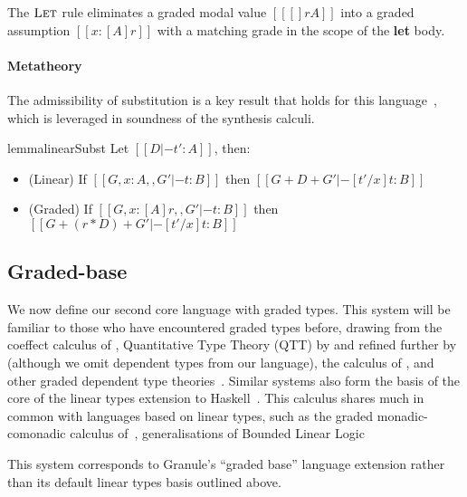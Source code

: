 The $\textsc{Let}$ rule eliminates a graded modal value $[[ [] r A ]]$
into a graded assumption $[[ x : [ A ] r ]]$ with a matching
grade in the scope of the \textbf{let} body.


\paragraph{Metatheory}
The admissibility of substitution is a key result that holds
for this language~\cite{DBLP:journals/pacmpl/OrchardLE19}, which is
leveraged in soundness of the synthesis calculi.
%
\begin{restatable}{lemma}{linearSubst}
Let $[[ D |- t' : A]]$, then:
\label{lemma:substitution}
\begin{itemize}[leftmargin=1em]
\item (Linear) \hspace{0.04em} If $[[ {G, x : A}
    ,, { G' } |- t : B]]$ then $[[ G + D + G' |-
[ t' / x ] t : B ]]$
\item (Graded) If $[[ {G, x : [A] r} ,, { G' } |- t : B]]$
then $[[ G + (r * D) + G' |- [ t' / x ] t : B ]]$
\end{itemize}
\end{restatable}


\subsection{Graded-base}
\label{sec:graded-base}

We now define our second core language with graded types. This system will be familiar to
those who have encountered graded types before, drawing from the coeffect calculus of \citet{petricek2014coeffects}, Quantitative Type Theory (QTT) by \citet{McBride2016} and refined further by \citet{quantitative-type-theory} (although we omit dependent types from our language), the calculus of \citet{DBLP:journals/pacmpl/AbelB20}, and other graded dependent type theories~\cite{quantitative-type-theory,DBLP:conf/esop/MoonEO21}. Similar
systems also form the basis of the core of the linear types extension to Haskell~\cite{DBLP:journals/pacmpl/BernardyBNJS18}.
This calculus shares much in common with languages based on linear types, such
as the graded monadic-comonadic calculus of~\cite{combining2016}, generalisations of Bounded
Linear Logic~\cite{DBLP:conf/esop/BrunelGMZ14,DBLP:conf/esop/GhicaS14}


This system corresponds to Granule's ``graded base'' language extension rather than its
default linear types basis outlined above.


